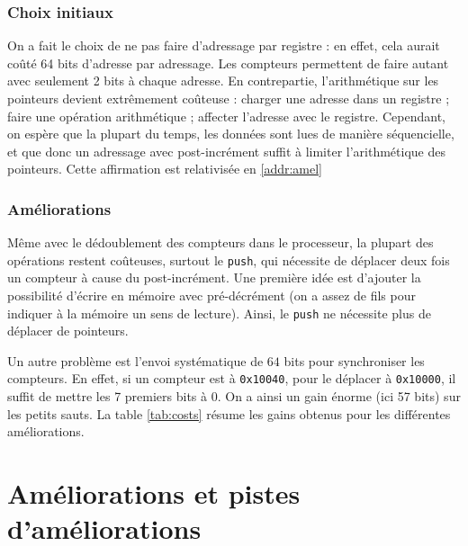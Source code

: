 \documentclass[architecture]{compas2018}
\begin{document}
\subsubsection{Choix initiaux}
On a fait le choix de ne pas faire d'adressage par registre : en effet, cela aurait coûté 64 bits d'adresse par adressage. Les compteurs permettent de faire autant avec seulement 2 bits à chaque adresse. En contrepartie, l'arithmétique sur les pointeurs devient extrêmement coûteuse : charger une adresse dans un registre ; faire une opération arithmétique ; affecter l'adresse avec le registre. Cependant, on espère que la plupart du temps, les données sont lues de manière séquencielle, et que donc un adressage avec post-incrément suffit à limiter l'arithmétique des pointeurs. Cette affirmation est relativisée en \ref{addr:amel}  
\subsubsection{Améliorations\label{addr:amel}}
Même avec le dédoublement des compteurs dans le processeur, la plupart des opérations restent coûteuses, surtout le \texttt{push}, qui nécessite de déplacer deux fois un compteur à cause du post-incrément. Une première idée est d'ajouter la possibilité d'écrire en mémoire avec pré-décrément (on a assez de fils pour indiquer à la mémoire un sens de lecture). Ainsi, le \texttt{push} ne nécessite plus de déplacer de pointeurs.\par
Un autre problème est l'envoi systématique de $64$ bits pour synchroniser les compteurs. En effet, si un compteur est à \texttt{0x10040}, pour le déplacer à \texttt{0x10000}, il suffit de mettre les 7 premiers bits à 0. On a ainsi un gain énorme (ici 57 bits) sur les petits sauts. La table \ref{tab:costs} résume les gains obtenus pour les différentes améliorations.


\section{Améliorations et pistes d'améliorations \label{sec:amelioration}}
\end{document}
